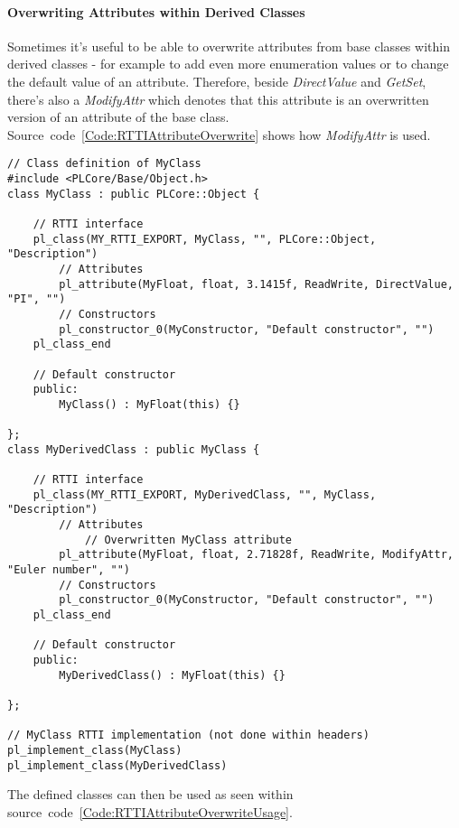 \paragraph{Overwriting Attributes within Derived Classes}
Sometimes it's useful to be able to overwrite attributes from base classes within derived classes - for example to add even more enumeration values or to change the default value of an attribute. Therefore, beside \emph{DirectValue} and \emph{GetSet}, there's also a \emph{ModifyAttr} which denotes that this attribute is an overwritten version of an attribute of the base class. Source~code~\ref{Code:RTTIAttributeOverwrite} shows how \emph{ModifyAttr} is used.
\begin{lstlisting}[label=Code:RTTIAttributeOverwrite,caption={Overwriting RTTI attributes in derived classes}]
// Class definition of MyClass
#include <PLCore/Base/Object.h>
class MyClass : public PLCore::Object {

	// RTTI interface
	pl_class(MY_RTTI_EXPORT, MyClass, "", PLCore::Object, "Description")
		// Attributes
		pl_attribute(MyFloat, float, 3.1415f, ReadWrite, DirectValue, "PI", "")
		// Constructors
		pl_constructor_0(MyConstructor, "Default constructor", "")
	pl_class_end

	// Default constructor
	public:
		MyClass() : MyFloat(this) {}

};
class MyDerivedClass : public MyClass {

	// RTTI interface
	pl_class(MY_RTTI_EXPORT, MyDerivedClass, "", MyClass, "Description")
		// Attributes
			// Overwritten MyClass attribute
		pl_attribute(MyFloat, float, 2.71828f, ReadWrite, ModifyAttr, "Euler number", "")
		// Constructors
		pl_constructor_0(MyConstructor, "Default constructor", "")
	pl_class_end

	// Default constructor
	public:
		MyDerivedClass() : MyFloat(this) {}

};

// MyClass RTTI implementation (not done within headers)
pl_implement_class(MyClass)
pl_implement_class(MyDerivedClass)
\end{lstlisting}
The defined classes can then be used as seen within source~code~\ref{Code:RTTIAttributeOverwriteUsage}.
